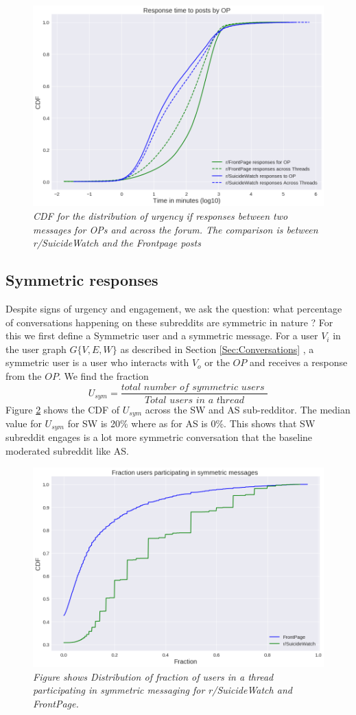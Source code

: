 \begin{figure}[!h]
	\centering
	\includegraphics[width=0.5\columnwidth]{Figures/respTimeDist}
	\caption{\textsl{ CDF for the distribution of urgency if responses between two messages for OPs and across the forum. The comparison is between r/SuicideWatch and the Frontpage posts }}
	\label{fig:responseTimeDist}
\end{figure}

\subsection{Symmetric responses}
Despite signs of urgency and engagement, we ask the question: what percentage of conversations happening on these subreddits are symmetric in nature ? 
For this we first define a Symmetric user and a symmetric message. For a user $V_i$ in the user graph $G\{V,E,W\}$ as described in Section \ref{Sec:Conversations} , a symmetric user is a user who interacts with $V_o$ or the $OP$ and receives a response from the $OP$. We find the fraction $$U_{sym}=\frac{\textit{total number of symmetric users }}{\textit{Total users in a thread}}$$
Figure \ref{fig:symUsers} shows the CDF of $U_{sym}$ across the SW and AS sub-redditor.  The median value for $U_{sym}$ for SW is 20\% where as for AS is 0\%. This shows that SW subreddit engages is a lot more symmetric conversation that the baseline moderated subreddit like AS.



\begin{figure}[!h]
	\centering
	\includegraphics[width=0.5\columnwidth]{Figures/SymUsers.png}
	\caption{\textsl{ Figure shows Distribution of fraction of users in a thread participating in symmetric messaging for  r/SuicideWatch and FrontPage. }}
	\label{fig:symUsers}
\end{figure}


